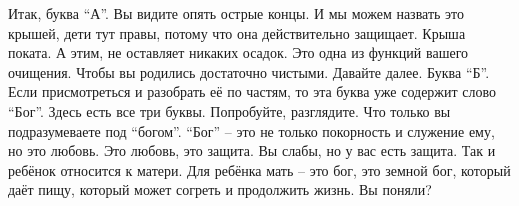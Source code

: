   Итак, буква ``А''. Вы видите опять острые концы. И мы можем назвать это крышей, дети  тут правы, потому что она действительно защищает. Крыша поката. А этим,  не оставляет никаких осадок. Это одна из функций вашего очищения. Чтобы вы родились достаточно чистыми. Давайте далее.
  Буква ``Б''. Если присмотреться и разобрать её по частям, то эта буква уже содержит слово ``Бог''. Здесь есть все три буквы. Попробуйте, разглядите. Что только вы подразумеваете под ``богом''. ``Бог'' – это не только покорность и служение ему, но это любовь. Это любовь, это защита. Вы слабы, но у вас есть защита. Так и ребёнок относится к матери. Для ребёнка мать – это бог, это земной бог, который даёт пищу, который может согреть и продолжить жизнь. Вы поняли?
  
